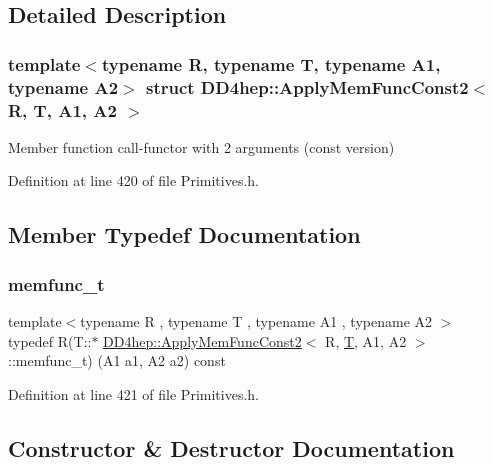 \subsection{Detailed Description}
\subsubsection*{template$<$typename R, typename T, typename A1, typename A2$>$\newline
struct D\+D4hep\+::\+Apply\+Mem\+Func\+Const2$<$ R, T, A1, A2 $>$}

Member function call-\/functor with 2 arguments (const version) 

Definition at line 420 of file Primitives.\+h.



\subsection{Member Typedef Documentation}
\hypertarget{struct_d_d4hep_1_1_apply_mem_func_const2_ac0e4dae57560aa3d5f8d489605c714e3}{}\label{struct_d_d4hep_1_1_apply_mem_func_const2_ac0e4dae57560aa3d5f8d489605c714e3} 
\subsubsection{\texorpdfstring{memfunc\+\_\+t}{memfunc\_t}}
{\footnotesize\ttfamily template$<$typename R , typename T , typename A1 , typename A2 $>$ \\
typedef R(T\+::$\ast$ \hyperlink{struct_d_d4hep_1_1_apply_mem_func_const2}{D\+D4hep\+::\+Apply\+Mem\+Func\+Const2}$<$ R, \hyperlink{class_t}{T}, A1, A2 $>$\+::memfunc\+\_\+t) (A1 a1, A2 a2) const}



Definition at line 421 of file Primitives.\+h.



\subsection{Constructor \& Destructor Documentation}
\hypertarget{struct_d_d4hep_1_1_apply_mem_func_const2_a41c881b9faf4f7f0fe9c82e3a39c4ca0}{}\label{struct_d_d4hep_1_1_apply_mem_func_const2_a41c881b9faf4f7f0fe9c82e3a39c4ca0} 
